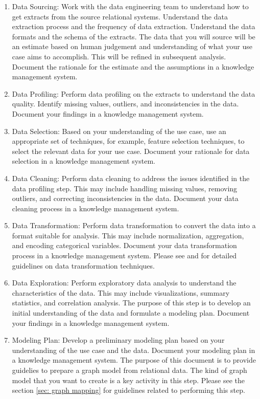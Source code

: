 \documentclass{article}
\begin{document}
\begin{enumerate}
    \item Data Sourcing: Work with the data engineering team to understand how to get extracts from the source relational systems. Understand the data extraction process and the frequency of data extraction. Understand the data formats and the schema of the extracts. The data that you will source will be an estimate based on human judgement and understanding of what your use case aims to accomplish. This will be refined in subsequent analysis. Document the rationale for the estimate and the assumptions in a knowledge management system.
    \item Data Profiling: Perform data profiling on the extracts to understand the data quality. Identify missing values, outliers, and inconsistencies in the data. Document your findings in a knowledge management system.
    \item Data Selection: Based on your understanding of the use case, use an appropriate set of techniques, for example, feature selection techniques, to select the relevant data for your use case. Document your rationale for data selection in a knowledge management system. 
    \item Data Cleaning: Perform data cleaning to address the issues identified in the data profiling step. This may include handling missing values, removing outliers, and correcting inconsistencies in the data. Document your data cleaning process in a knowledge management system.
    \item Data Transformation: Perform data transformation to convert the data into a format suitable for analysis. This may include normalization, aggregation, and encoding categorical variables. Document your data transformation process in a knowledge management system. Please see \cite{kuhn2013applied} and \cite{bookdownFeatureEngineering} for detailed guidelines on data transformation techniques.
    \item Data Exploration: Perform exploratory data analysis to understand the characteristics of the data. This may include visualizations, summary statistics, and correlation analysis. The purpose of this step is to develop an initial understanding of the data and formulate a modeling plan. Document your findings in a knowledge management system.
    \item Modeling Plan: Develop a preliminary modeling plan based on your understanding of the use case and the data. Document your modeling plan in a knowledge management system. The purpose of this document is to provide guidelies to prepare a graph model from relational data. The kind of graph model that you want to create is a key activity in this step. Please see the section \ref{sec: graph mapping} for guidelines related to performing this step.

\end{enumerate}
\end{document}
